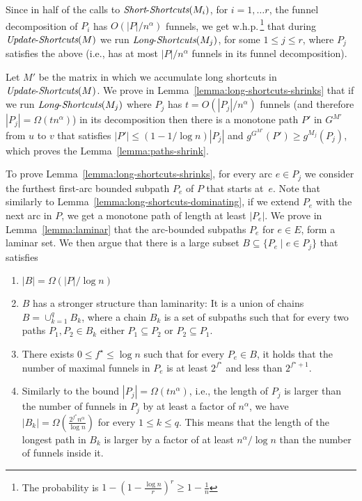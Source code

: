 \documentclass[11pt]{article}
\newcommand{\LS}{\mbox{{\it Long}-{\it Shortcuts}}}
\newcommand{\Simple}{\mbox{{\it Short}-{\it Shortcuts}}}
\newcommand{\UpdateS}{\mbox{{\it Update}-{\it Shortcuts}}}
\begin{document}
Since in half of the calls to $\Simple(M_i)$, for
$i=1,\ldots r$, the funnel decomposition of $P_i$
 has $O(|P|/n^{\alpha})$ funnels, we get w.h.p.\,\footnote{The probability is $1-\left( 1- \frac{\log n}{r} \right)^r \ge 1-\frac{1}{n}$} that during $\UpdateS(M)$ we run $\LS(M_j)$, for some $1\le j \le r$, where $P_j$ satisfies the above (i.e., has at most $|P|/n^\alpha$ funnels in its funnel decomposition).


Let $M'$ be the matrix in which we accumulate long shortcuts in $\UpdateS(M)$. We prove in Lemma~\ref{lemma:long-shortcuts-shrinks} that if we run $\LS(M_j)$ where $P_j$ has $t=O(|P_j|/n^\alpha)$ funnels (and therefore $|P_j| = \Omega(t n^\alpha)$) in its decomposition then there is a monotone path $P'$ in $G^{M'}$ from $u$ to $v$ that satisfies $|P'| \le  \left( 1- 1/\log n \right)|P_j|$ and $g^{G^{M'}}(P') \ge g^{M_j}(P_j)$, which proves the Lemma~\ref{lemma:paths-shrink}.

To prove Lemma~\ref{lemma:long-shortcuts-shrinks}, for every arc $e\in P_j$ we consider the furthest first-arc bounded subpath $P_e$ of $P$ that starts at~$e$. Note that similarly to Lemma~\ref{lemma:long-shortcuts-dominating}, if we extend $P_e$ with the next arc in $P$, we get a monotone path of length at least $|P_e|$. We prove in Lemma~\ref{lemma:laminar} that the arc-bounded subpaths $P_e$ for $e\in E$, form a laminar set. We then argue that there is a large subset $B \subseteq \{P_e \mid e\in P_j\}$ that satisfies

\begin{enumerate}
    \item $|B| = \Omega(|P|/\log n)$
    \item $B$ has a stronger structure than laminarity: It is a union of chains $B = \cup_{k=1}^q B_k$, where a chain $B_k$ is a set of subpaths such that for every two paths $P_1,P_2\in B_k$ either $P_1\subseteq P_2$ or $P_2\subseteq P_1$.
    \item There exists $0\le f^\star \le \log n$ such that for every  $P_e\in B$, it holds that the number of maximal funnels in $P_e$ is at least $2^{f^\star}$ and less than $2^{f^\star +1 }$.
    \item Similarly to the bound $|P_j| = \Omega(t n^\alpha)$, i.e., the length of $P_j$ is larger than the number of funnels in $P_j$ by at least a factor of $n^\alpha$, we have $|B_k| = \Omega\left( \frac{2^{f^\star} n^\alpha}{\log n} \right)$ for every $1\le k \le q$. This means that the length of the longest path in $B_k$ is larger by a factor of at least $n^\alpha /\log n$ than the number of funnels inside it.
\end{enumerate}
\end{document}
